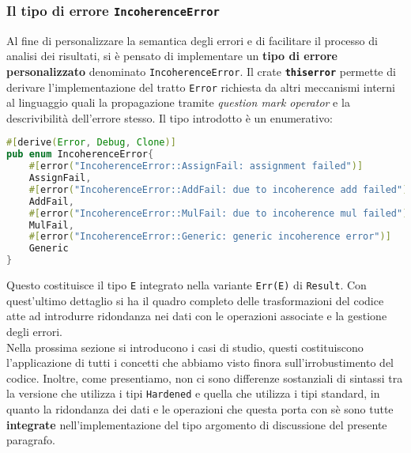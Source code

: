 \subsubsection{Il tipo di errore \texttt{IncoherenceError}}
Al fine di personalizzare la semantica degli errori e di facilitare il processo di analisi dei risultati, si è pensato di implementare un \textbf{tipo di errore personalizzato} denominato \texttt{IncoherenceError}. Il crate \textbf{\texttt{thiserror}} permette di derivare l'implementazione del tratto \texttt{Error} richiesta da altri meccanismi interni al linguaggio quali la propagazione tramite \textit{question mark operator} e la descrivibilità dell'errore stesso. Il tipo introdotto è un enumerativo: 

\begin{lstlisting}[language=Rust, style=boxed]
#[derive(Error, Debug, Clone)]
pub enum IncoherenceError{
    #[error("IncoherenceError::AssignFail: assignment failed")]
    AssignFail,
    #[error("IncoherenceError::AddFail: due to incoherence add failed")]
    AddFail,
    #[error("IncoherenceError::MulFail: due to incoherence mul failed")]
    MulFail,
    #[error("IncoherenceError::Generic: generic incoherence error")]
    Generic
}
\end{lstlisting}
Questo costituisce il tipo \texttt{E} integrato nella variante \texttt{Err(E)} di \texttt{Result}. Con quest'ultimo dettaglio si ha il quadro completo delle trasformazioni del codice atte ad introdurre ridondanza nei dati con le operazioni associate e la gestione degli errori. \\
Nella prossima sezione si introducono i casi di studio, questi costituiscono l'applicazione di tutti i concetti che abbiamo visto finora sull'irrobustimento del codice. Inoltre, come presentiamo, non ci sono differenze sostanziali di sintassi tra la versione che utilizza i tipi \texttt{Hardened} e quella che utilizza i tipi standard, in quanto la ridondanza dei dati e le operazioni che questa porta con sè sono tutte \textbf{integrate} nell'implementazione del tipo argomento di discussione del presente paragrafo.

